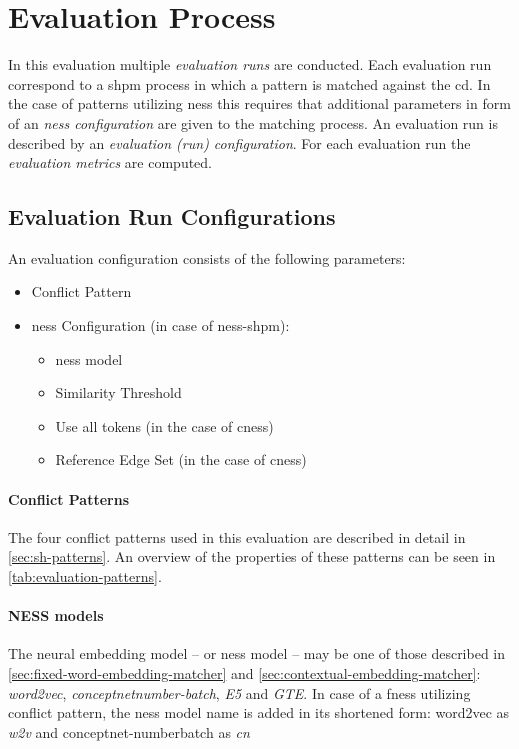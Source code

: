 \documentclass[11pt, numbers=noenddot]{scrreprt}
\begin{document}
\section{Evaluation Process}
In this evaluation multiple \textit{evaluation runs} are conducted. Each evaluation run correspond to a \gls{shpm} process in which a pattern is matched against the \gls{cd}. In the case of patterns utilizing \gls{ness} this requires that additional parameters in form of an \textit{\gls{ness} configuration} are given to the matching process. An evaluation run is described by an \textit{evaluation (run) configuration}. For each evaluation run the \textit{evaluation metrics} are computed. 

\subsection{Evaluation Run Configurations}
An evaluation configuration consists of the following parameters:
\begin{itemize}
	\item Conflict Pattern
	\item \gls{ness} Configuration (in case of \gls{ness-shpm}): 
	\begin{itemize}
		\item \gls{ness} model
		\item Similarity Threshold 
		\item Use  all tokens (in the case of \gls{cness}) 
		\item Reference Edge Set (in the case of \gls{cness}) 
	\end{itemize}
\end{itemize}


\paragraph{Conflict Patterns}
The four conflict patterns used in this evaluation are described in detail in \cref{sec:sh-patterns}. An overview of the properties of these patterns can be seen in \cref{tab:evaluation-patterns}.


\paragraph{NESS models}
The neural embedding model -- or \gls{ness} model -- may be one of those described in \cref{sec:fixed-word-embedding-matcher} and \cref{sec:contextual-embedding-matcher}: \textit{word2vec}, \textit{conceptnetnumber-batch}, \textit{E5} and \textit{GTE}. In case of a \gls{fness} utilizing conflict pattern, the \gls{ness} model name is added in its shortened form: word2vec as \textit{w2v} and conceptnet-numberbatch as \textit{cn}
\end{document}
